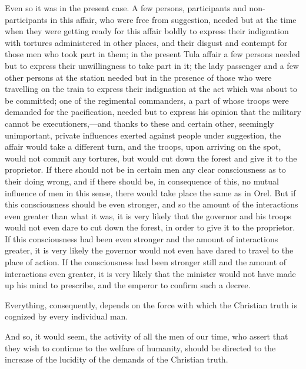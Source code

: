 \documentclass{book}
\begin{document}
Even so it was in the present case. A few persons, participants and non-participants in this affair, who were free from suggestion, needed but at the time when they were getting ready for this affair boldly to express their indignation with tortures administered in other places, and their disgust and contempt for those men who took part in them; in the present Tula affair a few persons needed but to express their unwillingness to take part in it; the lady passenger and a few other persons at the station needed but in the presence of those who were travelling on the train to express their indignation at the act which was about to be committed; one of the regimental commanders, a part of whose troops were demanded for the pacification, needed but to express his opinion that the military cannot be executioners,—and thanks to these and certain other, seemingly unimportant, private influences exerted against people under suggestion, the affair would take a different turn, and the troops, upon arriving on the spot, would not commit any tortures, but would cut down the forest and give it to the proprietor. If there should not be in certain men any clear consciousness as to their doing wrong, and if there should be, in consequence of this, no mutual influence of men in this sense, there would take place the same as in Orel. But if this consciousness should be even stronger, and so the amount of the interactions even greater than what it was, it is very likely that the governor and his troops would not even dare to cut down the forest, in order to give it to the proprietor. If this consciousness had been even stronger and the amount of interactions greater, it is very likely the governor would not even have dared to travel to the place of action. If the consciousness had been stronger still and the amount of interactions even greater, it is very likely that the minister would not have made up his mind to prescribe, and the emperor to confirm such a decree.

Everything, consequently, depends on the force with which the Christian truth is cognized by every individual man.

And so, it would seem, the activity of all the men of our time, who assert that they wish to continue to the welfare of humanity, should be directed to the increase of the lucidity of the demands of the Christian truth.
\end{document}

